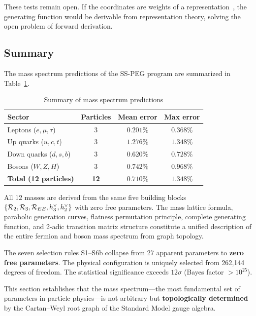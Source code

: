 These tests remain open. If the coordinates are weights of a representation~\cite{coxeter1973special}, the generating function would be derivable from representation theory, solving the open problem of forward derivation.

\subsection{Summary}\label{sec:mass_summary}

The mass spectrum predictions of the SS-PEG program are summarized in Table~\ref{tab:mass_summary}.

\begin{table}[h]
\centering
\caption{Summary of mass spectrum predictions}
\label{tab:mass_summary}
\begin{tabular}{lccc}
\hline\hline
Sector & Particles & Mean error & Max error \\
\hline
Leptons ($e, \mu, \tau$) & 3 & $0.201\%$ & $0.368\%$ \\
Up quarks ($u, c, t$) & 3 & $1.276\%$ & $1.348\%$ \\
Down quarks ($d, s, b$) & 3 & $0.620\%$ & $0.728\%$ \\
Bosons ($W, Z, H$) & 3 & $0.742\%$ & $0.968\%$ \\
\textbf{Total (12 particles)} & \textbf{12} & \textbf{$0.710\%$} & \textbf{$1.348\%$} \\
\hline\hline
\end{tabular}
\end{table}

All 12 masses are derived from the same five building blocks $\{\mathcal{R}_2, \mathcal{R}_3, \mathcal{R}_{EE}, h^\vee_3, h^\vee_2\}$ with zero free parameters. The mass lattice formula, parabolic generation curves, flatness permutation principle, complete generating function, and 2-adic transition matrix structure constitute a unified description of the entire fermion and boson mass spectrum from graph topology.

The seven selection rules S1--S6b collapse from 27 apparent parameters to \textbf{zero free parameters}. The physical configuration is uniquely selected from 262,144 degrees of freedom. The statistical significance exceeds $12\sigma$ (Bayes factor $> 10^{25}$).

This section establishes that the mass spectrum---the most fundamental set of parameters in particle physics---is not arbitrary but \textbf{topologically determined} by the Cartan--Weyl root graph of the Standard Model gauge algebra.
